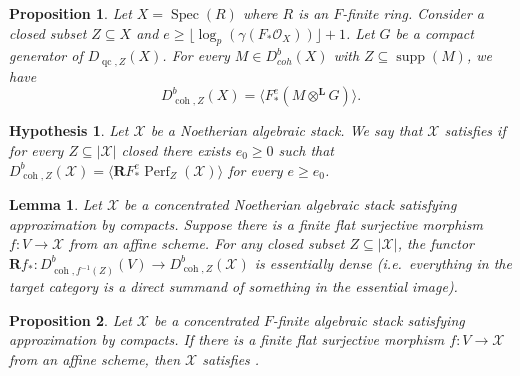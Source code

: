 \documentclass[10pt,a4paper]{amsart}
\newtheorem{lemma}{Lemma}
\newtheorem{proposition}{Proposition}
\newtheorem{hypothesis}{Hypothesis}
\begin{document}
\begin{proposition}
    \label{prop:relative_Frobenius_generation_local_ring}
    Let $X=\operatorname{Spec}(R)$ where $R$ is an $F$-finite ring. 
    Consider a closed subset $Z\subseteq X$ and $e \geq \lfloor \log_p (\gamma(F_\ast \mathcal{O}_X))\rfloor + 1$.
    Let $G$ be a compact generator of $D_{\operatorname{qc},Z}(X)$. For every $M\in D_{coh}^b(X)$ with $Z\subseteq\operatorname{supp}(M)$, we have
    \begin{displaymath}
        D^b_{\operatorname{coh},Z}(X)= \langle F_\ast^e (M\otimes^{\mathbf{L}}G) \rangle.
    \end{displaymath}
\end{proposition}

\begin{hypothesis}
    \label{hyp:frob_gen}
    Let $\mathcal{X}$ be a Noetherian algebraic stack. 
    We say that $\mathcal{X}$ satisfies  if for every $Z\subseteq |\mathcal{X}|$ closed there exists $e_0 \geq 0$ such that $D^b_{\operatorname{coh},Z}(\mathcal{X})= \langle \mathbf{R} F_\ast^e \operatorname{Perf}_Z (\mathcal{X}) \rangle$ for every $e\geq e_0$. 
\end{hypothesis}

\begin{lemma}
    \label{lem:finite_cover_quotients_for_support}
    Let $\mathcal{X}$ be a concentrated Noetherian algebraic stack satisfying approximation by compacts. 
    Suppose there is a finite flat surjective morphism $f\colon V \to \mathcal{X}$ from an affine scheme. 
    For any closed subset $Z\subseteq |\mathcal{X}|$, the functor $\mathbf{R}f_\ast \colon D^b_{\operatorname{coh},f^{-1}(Z)}(V) \to D^b_{\operatorname{coh},Z}(\mathcal{X})$ is essentially dense (i.e.\ everything in the target category is a direct summand of something in the essential image).
\end{lemma}

\begin{proposition}
    \label{prop:finite_cover}
    Let $\mathcal{X}$ be a concentrated $F$-finite algebraic stack satisfying approximation by compacts.
    If there is a finite flat surjective morphism $f\colon V \to \mathcal{X}$ from an affine scheme, then $\mathcal{X}$ satisfies .
\end{proposition}
\end{document}
